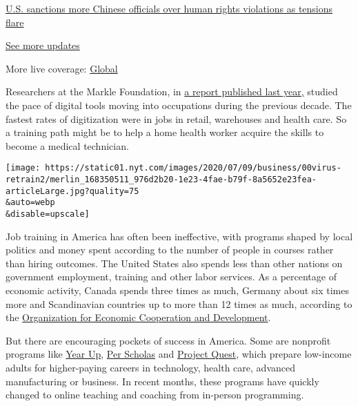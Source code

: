 \href{https://www.nytimes.com/live/2020/07/31/business/stock-market-today-coronavirus?action=click\&pgtype=Article\&state=default\&region=MAIN_CONTENT_1\&context=storylines_live_updates\#us-sanctions-more-chinese-officials-over-human-rights-violations-as-tensions-flare}{U.S.
sanctions more Chinese officials over human rights violations as
tensions flare}

\href{https://www.nytimes.com/live/2020/07/31/business/stock-market-today-coronavirus?action=click\&pgtype=Article\&state=default\&region=MAIN_CONTENT_1\&context=storylines_live_updates}{See
more updates}

More live coverage:
\href{https://www.nytimes.com/2020/08/01/world/coronavirus-covid-19.html?action=click\&pgtype=Article\&state=default\&region=MAIN_CONTENT_1\&context=storylines_live_updates}{Global}

Researchers at the Markle Foundation, in
\href{https://www.markle.org/digitalblindspot}{a report published last
year,} studied the pace of digital tools moving into occupations during
the previous decade. The fastest rates of digitization were in jobs in
retail, warehouses and health care. So a training path might be to help
a home health worker acquire the skills to become a medical technician.

\texttt{[image: https://static01.nyt.com/images/2020/07/09/business/00virus-retrain2/merlin\_168350511\_976d2b20-1e23-4fae-b79f-8a5652e23fea-articleLarge.jpg?quality=75\\\&auto=webp\\\&disable=upscale]}

Job training in America has often been ineffective, with programs shaped
by local politics and money spent according to the number of people in
courses rather than hiring outcomes. The United States also spends less
than other nations on government employment, training and other labor
services. As a percentage of economic activity, Canada spends three
times as much, Germany about six times more and Scandinavian countries
up to more than 12 times as much, according to the
\href{https://data.oecd.org/socialexp/public-spending-on-labour-markets.htm}{Organization
for Economic Cooperation and Development}.

But there are encouraging pockets of success in America. Some are
nonprofit programs like \href{https://www.yearup.org/}{Year Up},
\href{https://perscholas.org/}{Per Scholas} and
\href{https://questsa.org/}{Project Quest}, which prepare low-income
adults for higher-paying careers in technology, health care, advanced
manufacturing or business. In recent months, these programs have quickly
changed to online teaching and coaching from in-person programming.

